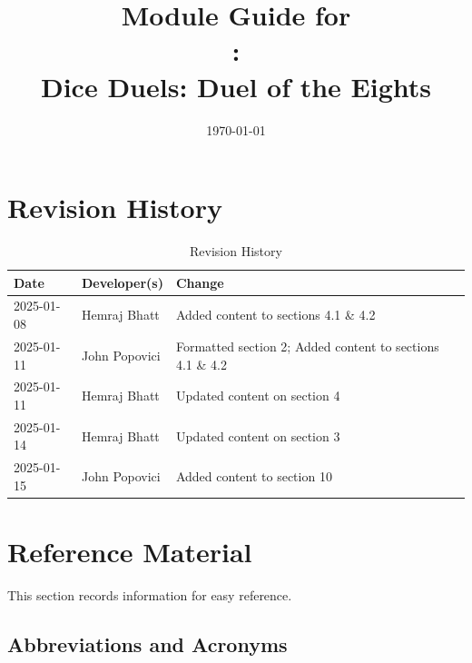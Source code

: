 \documentclass[12pt, titlepage]{article}
\begin{document}
\title{Module Guide for \\\progname: \\Dice Duels: Duel of the Eights} 
\author{\authname}
\date{\today}

\maketitle


\section{Revision History}

\begin{table}[hp]
\caption{Revision History} \label{TblRevisionHistory}
\begin{tabularx}{\textwidth}{llX}
\toprule
\textbf{Date} & \textbf{Developer(s)} & \textbf{Change}\\
\midrule
2025-01-08 & Hemraj Bhatt & Added content to sections 4.1 \& 4.2\\
2025-01-11 & John Popovici & Formatted section 2; Added content to sections 4.1 \& 4.2\\
2025-01-11 & Hemraj Bhatt & Updated content on section 4\\
2025-01-14 & Hemraj Bhatt & Updated content on section 3\\
2025-01-15 & John Popovici & Added content to section 10\\
\bottomrule
\end{tabularx}
\end{table}

\newpage

\section{Reference Material}

This section records information for easy reference.

\subsection{Abbreviations and Acronyms}
\end{document}

